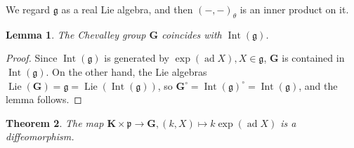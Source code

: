 \documentclass[12pt]{amsart}
\newtheorem{theorem}{Theorem}[section]
\newtheorem{lemma}[theorem]{Lemma}
\begin{document}
We regard $\mathfrak{g}$ as a real Lie algebra, and then $(-,-)_{\theta}$ is an inner product on it.

\begin{lemma}
    The Chevalley group $\mathbf{G}$ coincides with $\operatorname{Int}(\mathfrak{g})$.
\end{lemma}

\begin{proof}
    Since $\operatorname{Int}(\mathfrak{g})$ is generated by $\operatorname{exp}(\operatorname{ad}X), X\in \mathfrak{g}$, $\mathbf{G}$ is contained in $\operatorname{Int}(\mathfrak{g})$.
    On the other hand, the Lie algebras $\operatorname{Lie}(\mathbf{G})=\mathfrak{g}=\operatorname{Lie}(\operatorname{Int}(\mathfrak{g}))$, so $\mathbf{G}^{\circ}=\operatorname{Int}(\mathfrak{g})^{\circ}=\operatorname{Int}(\mathfrak{g})$, and the lemma follows.
\end{proof}

\begin{theorem}
    The map $\mathbf{K}\times \mathfrak{p}\rightarrow \mathbf{G}, (k,X)\mapsto k\operatorname{exp}(\operatorname{ad}X)$ is a diffeomorphism.
\end{theorem}
\end{document}
